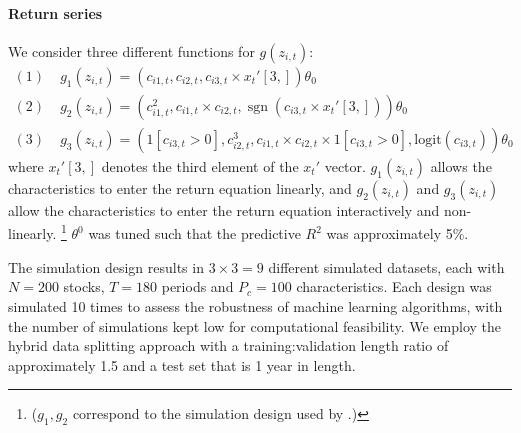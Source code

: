 \documentclass{article}
\begin{document}
\paragraph{Return series}
We consider three different functions for $g(z_{i, t})$:
\begin{align}
(1)\; & g_1 \left(z_{i, t}\right)=\left(c_{i 1, t}, c_{i 2, t}, c_{i 3, t} \times x_{t}'[3,]\right) \theta_{0} \\
(2)\; & g_2 \left(z_{i, t}\right)=\left(c_{i 1, t}^{2}, c_{i 1, t} \times c_{i 2, t}, \operatorname{sgn}\left(c_{i 3, t} \times  x_{t}'[3,]\right)\right) \theta_{0} \\
(3)\; & g_3 \left(z_{i, t}\right) = \left(1[c_{i3,t}>0],c_{i 2, t}^{3}, c_{i 1, t} \times c_{i 2, t}\times 1[c_{i3,t}>0], \text{logit}\left({c}_{i3, t} \right)\right) \theta_{0}
\end{align}
where $x_{t}'[3,]$ denotes the third element of the $x_{t}'$ vector.
$g_1 \left(z_{i, t}\right)$ allows the characteristics to enter the return equation linearly, and $g_2 \left(z_{i, t}\right)$ and $g_3 \left(z_{i, t}\right)$ allow the characteristics to enter the return equation interactively and non-linearly. \footnote{($g_1, g_2$ correspond to the simulation design used by \cite{gu_empirical_2018}.)} $\theta^0$ was tuned such that the predictive $R^2$ was approximately 5\%.

The simulation design results in $3 \times 3 = 9$ different simulated datasets, each with $N = 200$ stocks, $T = 180$ periods and $P_c = 100$ characteristics. Each design was simulated 10 times to assess the robustness of machine learning algorithms, with the number of simulations kept low for computational feasibility. We employ the hybrid data splitting approach with a training:validation length ratio of approximately 1.5 and a test set that is 1 year in length. 

\end{document}
